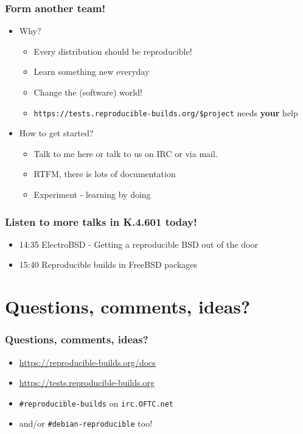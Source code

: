 \documentclass[14pt]{beamer}
\begin{document}
\begin{frame}
 \frametitle{Form another team!}

 \begin{itemize}
  \item Why?
   \begin{itemize}
    \item Every distribution should be reproducible!
    \item Learn something new everyday
    \item Change the (software) world!
    \item \texttt{https://tests.reproducible-builds.org/\$project} needs
    \textbf{your} help
   \end{itemize}
  \item How to get started?
   \begin{itemize}
    \item Talk to me here or talk to us on IRC or via mail.
    \item RTFM, there is lots of documentation
    \item Experiment - learning by doing
   \end{itemize}
 \end{itemize}
\end{frame}

\begin{frame}
 \frametitle{Listen to more talks in K.4.601 today!}

 \begin{itemize}
  \item 14:35 ElectroBSD - Getting a reproducible BSD out of the door
  \item 15:40 Reproducible builds in FreeBSD packages
 \end{itemize}
\end{frame}


\section{Questions, comments, ideas?}


\begin{frame}
 \frametitle{Questions, comments, ideas?}

 \begin{itemize}
  \item \url{https://reproducible-builds.org/docs}
  \item \url{https://tests.reproducible-builds.org}
  \item \texttt{\#reproducible-builds} on \texttt{irc.OFTC.net}
  \item \small{and/or \texttt{\#debian-reproducible} too!}
 \end{itemize}
\end{frame}
\end{document}
